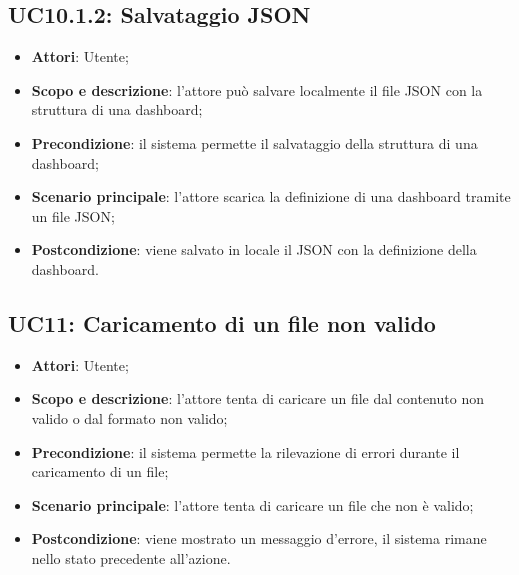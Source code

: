 \subsection{UC10.1.2: Salvataggio JSON}
\hypertarget{UC10.1.2}{}
\begin{itemize}
	\item \textbf{Attori}: Utente;
	\item \textbf{Scopo e descrizione}: l'attore può salvare localmente il file JSON con la struttura di una dashboard;
	\item \textbf{Precondizione}: il sistema permette il salvataggio della struttura di una dashboard;
	\item \textbf{Scenario principale}: l'attore scarica la definizione di una dashboard tramite un file JSON;
	\item \textbf{Postcondizione}: viene salvato in locale il JSON con la definizione della dashboard.
\end{itemize}

\subsection{UC11: Caricamento di un file non valido}
\hypertarget{UC11}{}
\begin{itemize}
	\item \textbf{Attori}: Utente;
	\item \textbf{Scopo e descrizione}: l'attore tenta di caricare un file dal contenuto non valido o dal formato non valido;
	\item \textbf{Precondizione}: il sistema permette la rilevazione di errori durante il caricamento di un file;
	\item \textbf{Scenario principale}: l'attore tenta di caricare un file che non è valido;
	\item \textbf{Postcondizione}: viene mostrato un messaggio d'errore, il sistema rimane nello stato precedente all'azione.
\end{itemize}


\pagebreak




